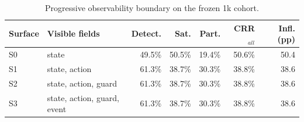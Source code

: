 \begin{table}[t]
\centering
\small
\caption{Progressive observability boundary on the frozen 1k cohort.}
\label{tab:observability-boundary}
\begin{tabular}{@{}l l r r r r r@{}}
\toprule
Surface & Visible fields & Detect. & Sat. & Part. & CRR$_{all}$ & Infl. (pp) \\
\midrule
S0 & state & 49.5\% & 50.5\% & 19.4\% & 50.6\% & 50.4 \\
S1 & state, action & 61.3\% & 38.7\% & 30.3\% & 38.8\% & 38.6 \\
S2 & state, action, guard & 61.3\% & 38.7\% & 30.3\% & 38.8\% & 38.6 \\
S3 & state, action, guard, event & 61.3\% & 38.7\% & 30.3\% & 38.8\% & 38.6 \\
\bottomrule
\end{tabular}
\end{table}

